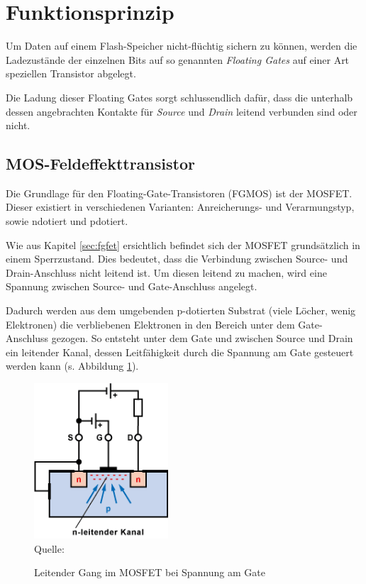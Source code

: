\section{Funktionsprinzip}\label{sec:funktion}

Um Daten auf einem Flash-Speicher nicht-flüchtig sichern zu können, werden die Ladezustände der einzelnen Bits auf so genannten \emph{Floating Gates} auf einer Art speziellen Transistor abgelegt. 

Die Ladung dieser Floating Gates sorgt schlussendlich dafür, dass die unterhalb dessen angebrachten Kontakte für \emph{Source} und \emph{Drain} leitend verbunden sind oder nicht.

\subsection{MOS-Feldeffekttransistor}

Die Grundlage für den Floating-Gate-Transistoren (FGMOS) ist der MOSFET. Dieser existiert in verschiedenen Varianten: Anreicherungs- und Verarmungstyp, sowie \gls{ndotiert} und \gls{pdotiert}.

Wie aus Kapitel \ref{sec:fgfet} ersichtlich befindet sich der MOSFET grundsätzlich in einem Sperrzustand. Dies bedeutet, dass die Verbindung zwischen Source- und Drain-Anschluss nicht leitend ist. Um diesen leitend zu machen, wird eine Spannung zwischen Source- und Gate-Anschluss angelegt.

Dadurch werden aus dem umgebenden p-dotierten Substrat (viele Löcher, wenig Elektronen) die verbliebenen Elektronen in den Bereich unter dem Gate-Anschluss gezogen. So entsteht unter dem Gate und zwischen Source und Drain ein leitender Kanal, dessen Leitfähigkeit durch die Spannung am Gate gesteuert werden kann (s. Abbildung \ref{fig:mosfetleitend}).

\begin{figure}[h]
    \centering
    \caption{Leitender Gang im MOSFET bei Spannung am Gate}
    \includegraphics[width=5cm]{sections/img/mosfet2}
    \label{fig:mosfetleitend}
    \\ Quelle: \cite{mosfetkomp}
\end{figure}

